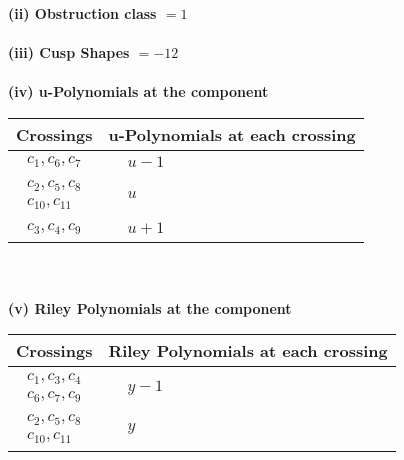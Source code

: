 \documentclass[1p]{elsarticle_modified}
\theoremstyle{definition}
\begin{document}
\flushleft \textbf{(ii) Obstruction class $= 1$}\\~\\
\flushleft \textbf{(iii) Cusp Shapes $= -12$}\\~\\
\newpage\renewcommand{\arraystretch}{1}
\flushleft \textbf{(iv) u-Polynomials at the component}\newline \\
\begin{tabular}{m{50pt}|m{274pt}}
Crossings & \hspace{64pt}u-Polynomials at each crossing \\
\hline $$\begin{aligned}c_{1},c_{6},c_{7}\end{aligned}$$&$\begin{aligned}
&u-1
\end{aligned}$\\
\hline $$\begin{aligned}c_{2},c_{5},c_{8}\\c_{10},c_{11}\end{aligned}$$&$\begin{aligned}
&u
\end{aligned}$\\
\hline $$\begin{aligned}c_{3},c_{4},c_{9}\end{aligned}$$&$\begin{aligned}
&u+1
\end{aligned}$\\
\hline
\end{tabular}\\~\\
\newpage\renewcommand{\arraystretch}{1}
\flushleft \textbf{(v) Riley Polynomials at the component}\newline \\
\begin{tabular}{m{50pt}|m{274pt}}
Crossings & \hspace{64pt}Riley Polynomials at each crossing \\
\hline $$\begin{aligned}c_{1},c_{3},c_{4}\\c_{6},c_{7},c_{9}\end{aligned}$$&$\begin{aligned}
&y-1
\end{aligned}$\\
\hline $$\begin{aligned}c_{2},c_{5},c_{8}\\c_{10},c_{11}\end{aligned}$$&$\begin{aligned}
&y
\end{aligned}$\\
\hline
\end{tabular}\\~\\
\end{document}
